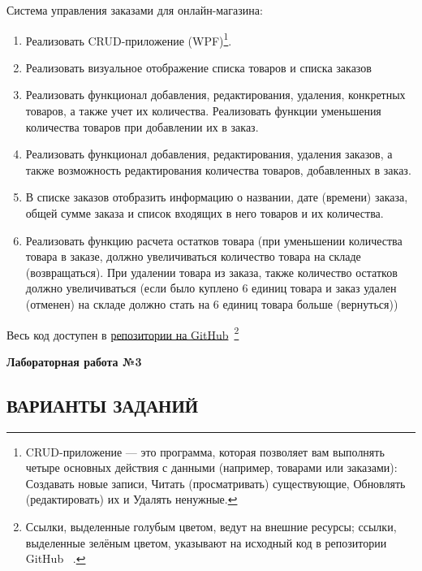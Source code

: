 \documentclass[12pt]{article}
\newcommand{\lablogo}
{
\begin{center}
    \huge{\textbf{Лабораторная работа №3}} \\
\end{center}
}
\newcommand{\colorURL}[1]{\textcolor{CtpBlue}{#1}}
\newcommand{\colorGIT}[1]{\textcolor{CtpGreen}{#1}}
\begin{document}
\noindent Система управления заказами для онлайн-магазина:
\begin{enumerate}
	\item Реализовать CRUD-приложение (WPF)\footnote{CRUD-приложение — это программа, которая позволяет вам выполнять четыре основных действия с данными (например, товарами или заказами): Создавать новые записи, Читать (просматривать) существующие, Обновлять (редактировать) их и Удалять ненужные.}.
	\item Реализовать визуальное отображение списка товаров и списка заказов
	\item Реализовать функционал добавления, редактирования, удаления, конкретных товаров, а также учет их количества. Реализовать функции уменьшения количества товаров при добавлении их в заказ.
	\item Реализовать функционал добавления, редактирования, удаления заказов, а также возможность редактирования количества товаров, добавленных в заказ.
	\item В списке заказов отобразить информацию о названии, дате (времени) заказа, общей сумме заказа и список входящих в него товаров и их количества.
	\item Реализовать функцию расчета остатков товара (при уменьшении количества товара в заказе, должно увеличиваться количество товара на складе (возвращаться). При удалении товара из заказа, также  количество остатков должно увеличиваться (если было куплено 6 единиц товара и заказ удален (отменен) на складе должно стать на 6 единиц товара больше (вернуться))
\end{enumerate}
Весь код доступен в \colorURL{\href{https://github.com/WebMasterIT/Csharp_Labs/tree/ec375afd16c0647b337cf3d8a79c8bef904fc1be}{репозитории на GitHub}\ \faGithub}\footnote{Ссылки, выделенные \colorURL{голубым} цветом, ведут на внешние ресурсы; ссылки, выделенные \colorGIT{зелёным} цветом, указывают на исходный код в репозитории GitHub \ \faGithub.}

\newpage

\lablogo

\begin{center}
	\subsection{ВАРИАНТЫ ЗАДАНИЙ \ \texorpdfstring{\faTasks}{}}
\end{center}
\end{document}
